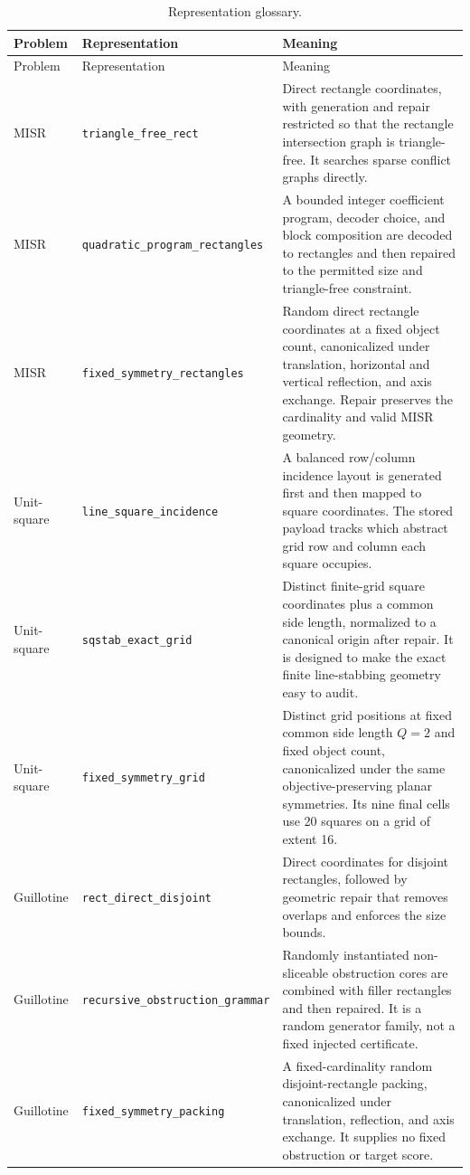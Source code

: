 \documentclass[11pt]{article}
\newcommand{\code}[1]{\texttt{#1}}
\begin{document}
\small
\begin{longtable}{@{}p{}p{}p{}@{}}
\caption{Representation glossary.}\label{tab:representation-glossary}\\
\toprule
Problem & Representation & Meaning \\
\midrule
\endfirsthead
\toprule
Problem & Representation & Meaning \\
\midrule
\endhead
\bottomrule
\endfoot
MISR & \code{triangle\_free\_rect} & Direct rectangle coordinates, with
generation and repair restricted so that the rectangle intersection graph is
triangle-free.  It searches sparse conflict graphs directly. \\
MISR & \code{quadratic\_\allowbreak{}program\_\allowbreak{}rectangles} & A bounded integer coefficient
program, decoder choice, and block composition are decoded to rectangles and
then repaired to the permitted size and triangle-free constraint. \\
MISR & \code{fixed\_\allowbreak{}symmetry\_\allowbreak{}rectangles} & Random direct rectangle
coordinates at a fixed object count, canonicalized under translation,
horizontal and vertical reflection, and axis exchange.  Repair preserves the
cardinality and valid MISR geometry. \\
\addlinespace
Unit-square & \code{line\_square\_incidence} & A balanced row/column incidence
layout is generated first and then mapped to square coordinates.  The stored
payload tracks which abstract grid row and column each square occupies. \\
Unit-square & \code{sqstab\_exact\_grid} & Distinct finite-grid square
coordinates plus a common side length, normalized to a canonical origin after
repair.  It is designed to make the exact finite line-stabbing geometry easy
to audit. \\
Unit-square & \code{fixed\_\allowbreak{}symmetry\_\allowbreak{}grid} & Distinct grid positions at
fixed common side length $Q=2$ and fixed object count, canonicalized under the
same objective-preserving planar symmetries.  Its nine final cells use 20
squares on a grid of extent 16. \\
\addlinespace
Guillotine & \code{rect\_direct\_disjoint} & Direct coordinates for disjoint
rectangles, followed by geometric repair that removes overlaps and enforces
the size bounds. \\
Guillotine & \code{recursive\_\allowbreak{}obstruction\_\allowbreak{}grammar} & Randomly instantiated
non-sliceable obstruction cores are combined with filler rectangles and then
repaired.  It is a random generator family, not a fixed injected certificate.
\\
Guillotine & \code{fixed\_\allowbreak{}symmetry\_\allowbreak{}packing} & A fixed-cardinality random
disjoint-rectangle packing, canonicalized under translation, reflection, and
axis exchange.  It supplies no fixed obstruction or target score. \\
\end{longtable}
\end{document}
